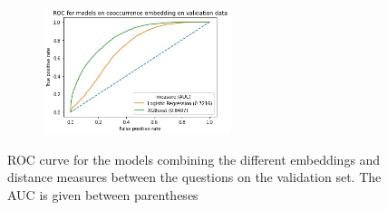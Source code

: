 \documentclass[11pt,a4paper]{article}
\begin{document}
\begin{figure}[H]
\begin{subfigure}[b]{\textwidth}
         \includegraphics[width=0.6\textwidth]{img/roc_clf_cooccurrence}
    \end{subfigure}
    \caption{ROC curve for the models combining the different embeddings and distance measures
    between the questions on the validation set. The AUC is given between parentheses}
    \label{fig:roc-classifier}
\end{figure}

\nocite{*}





\end{document}
